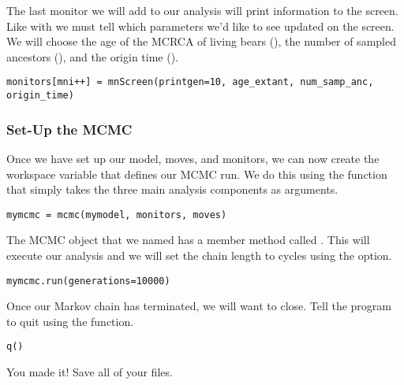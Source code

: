 The last monitor we will add to our analysis will print information to the screen.
Like with  we must tell  which parameters we'd like to see updated on the screen. 
We will choose the age of the MCRCA of living bears (), the number of sampled ancestors (), and the origin time ().
{\tt \begin{snugshade*}
\begin{lstlisting}
monitors[mni++] = mnScreen(printgen=10, age_extant, num_samp_anc, origin_time)
\end{lstlisting}
\end{snugshade*}}

\medskip
\subsubsection{Set-Up the MCMC}

Once we have set up our model, moves, and monitors, we can now create the workspace variable that defines our MCMC run. 
We do this using the  function that simply takes the three main analysis components as arguments.
{\tt \begin{snugshade*}
\begin{lstlisting}
mymcmc = mcmc(mymodel, monitors, moves)
\end{lstlisting}
\end{snugshade*}}

The MCMC object that we named  has a member method called . 
This will execute our analysis and we will set the chain length to  cycles using the  option.
{\tt \begin{snugshade*}
\begin{lstlisting}
mymcmc.run(generations=10000)
\end{lstlisting}
\end{snugshade*}}

Once our Markov chain has terminated, we will want \RevBayes to close. 
Tell the program to quit using the  function.
{\tt \begin{snugshade*}
\begin{lstlisting}
q()
\end{lstlisting}
\end{snugshade*}}

{\begin{framed}
You made it! Save all of your files.
\end{framed}}


